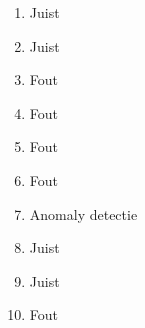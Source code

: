 \begin{enumerate}
  \item Juist
  \item Juist
  \item Fout
  \item Fout
  \item Fout
  \item Fout
  \item Anomaly detectie
  \item Juist
  \item Juist
  \item Fout
\end{enumerate}